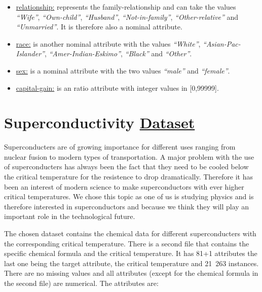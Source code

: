 \documentclass{article}[a4paper,12pt]
\begin{document}
\begin{itemize}
        \item \underline{relationship:} represents the family-relationship and can take the values \textit{\enquote{Wife}}, \textit{\enquote{Own-child}},  \textit{\enquote{Husband}}, \textit{\enquote{Not-in-family}}, \textit{\enquote{Other-relative}} and \textit{\enquote{Unmarried}}. It is therefore also a nominal attribute.
        \item \underline{race:} is another nominal attribute with the values  \textit{\enquote{White}},  \textit{\enquote{Asian-Pac-Islander}},  \textit{\enquote{Amer-Indian-Eskimo}},  \textit{\enquote{Black}} and  \textit{\enquote{Other}}.
        \item \underline{sex:} is a nominal attribute with the two values  \textit{\enquote{male}} and  \textit{\enquote{female}}.
        \item \underline{capital-gain:} is an ratio attribute with integer values in [0,99999]. 
    \end{itemize}
\section{Superconductivity \href{https://archive.ics.uci.edu/dataset/464/superconductivty+data}{Dataset}}

Superconducters are of growing importance for different uses ranging from nuclear fusion to modern types of transportation. A major problem with the use of superconducters has always been the fact that they need to be cooled below the critical temperature for the resistence to drop dramatically. Therefore it has been an interest of modern science to make superconductors with ever higher critical temperatures. We chose this topic as one of us is studying physics and is therefore interested in superconductors and because we think they will play an important role in the technological future.
\vspace{4mm}

The chosen dataset contains the chemical data for different superconducters with the corresponding critical temperature. There is a second file that contains the specific chemical formula and the critical temperature. It has 81+1 attributes the last one being the target attribute, the critical temperature and 21~263 instances. There are no missing values and all attributes (except for the chemical formula in the second file) are numerical. The attributes are:
\end{document}
